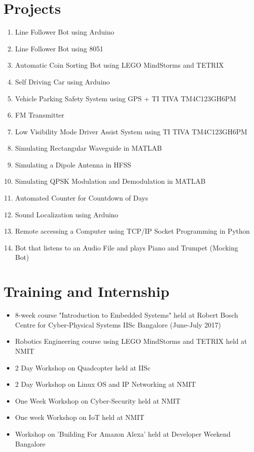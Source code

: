 \documentclass[12pt,a4paper,sans]{moderncv} %
\begin{document}

\section{Projects}

\begin{enumerate}
	\item Line Follower Bot using Arduino
	\item Line Follower Bot using 8051
	\item Automatic Coin Sorting Bot using LEGO MindStorms and TETRIX
	\item Self Driving Car using Arduino
	
	\item Vehicle Parking Safety System using GPS + TI TIVA TM4C123GH6PM
	\item FM Transmitter
	\item Low Visibility Mode Driver Assist System using
	TI TIVA TM4C123GH6PM 
	\item Simulating Rectangular Waveguide in MATLAB
	\item Simulating a Dipole Antenna in HFSS
	\item Simulating QPSK Modulation and Demodulation in MATLAB
	\item Automated Counter for Countdown of Days
	\item Sound Localization using Arduino
	
	\item Remote accessing a Computer using TCP/IP Socket Programming in Python
	\item Bot that listens to an Audio File and plays Piano and Trumpet (Mocking Bot) 
	\hfill 
	
\end{enumerate}
\hfill
\break


\section{Training and Internship}

\begin{itemize}
	\item  8-week course "Introduction to Embedded Systems" held at Robert Bosch Centre for Cyber-Physical Systems IISc Bangalore (June-July 2017)
	\item Robotics Engineering course using LEGO MindStorms and TETRIX held at NMIT 
	\item 2 Day Workshop on Quadcopter held at IISc
	\item 2 Day Workshop on Linux OS and IP Networking at NMIT
	\item One Week Workshop on Cyber-Security held at NMIT
	\item One week Workshop on IoT held at NMIT
	\item Workshop on 'Building For Amazon Alexa' held at Developer Weekend Bangalore
\end{itemize}
\end{document}
